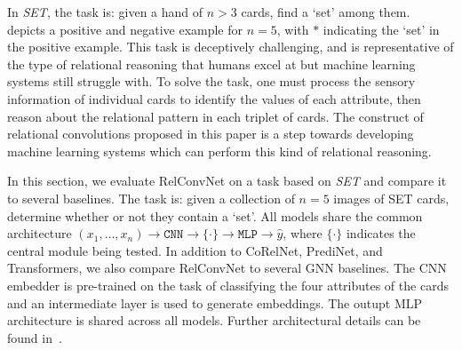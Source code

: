 
In \textit{SET}, the task is: given a hand of $n > 3$ cards, find a `set' among them.~ depicts a positive and negative example for $n=5$, with $*$ indicating the `set' in the positive example.
This task is deceptively challenging, and is representative of the type of relational reasoning that humans excel at but machine learning systems still struggle with. To solve the task, one must process the sensory information of individual cards to identify the values of each attribute, then reason about the relational pattern in each triplet of cards.
The construct of relational convolutions proposed in this paper is a step towards developing machine learning systems which can perform this kind of relational reasoning.


In this section, we evaluate RelConvNet on a task based on \textit{SET} and compare it to several baselines. The task is: given a collection of $n=5$ images of SET cards, determine whether or not they contain a `set'. All models share the common architecture $(x_1, \ldots, x_n) \to \texttt{CNN} \to \{ \cdot \} \to \texttt{MLP} \to \hat{y}$, where $\{\cdot\}$ indicates the central module being tested. In addition to CoRelNet, PrediNet, and Transformers, we also compare RelConvNet to several GNN baselines. The CNN embedder is pre-trained on the task of classifying the four attributes of the cards and an intermediate layer is used to generate embeddings. The outupt MLP architecture is shared across all models.
Further architectural details can be found in~. 

